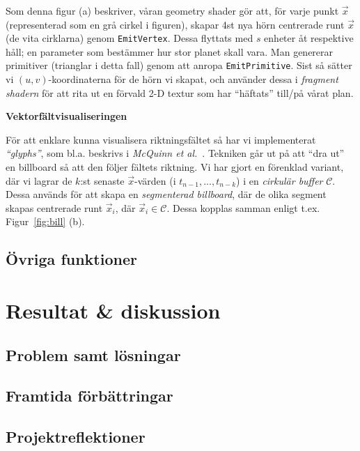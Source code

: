 \documentclass[a4paper]{article}
\begin{document}
\begin{multicols}{2}
Som denna figur (a) beskriver, våran geometry shader gör att, för varje punkt \(\vec{x}\) (representerad som en grå cirkel i figuren), skapar 4st nya hörn centrerade runt \(\vec{x}\) (de vita cirklarna) genom \texttt{EmitVertex}. Dessa flyttats med \(s\) enheter åt respektive håll; en parameter som bestämmer hur stor planet skall vara. Man genererar primitiver (trianglar i detta fall) genom att anropa \texttt{EmitPrimitive}. Sist så sätter vi \((u, v)\)-koordinaterna för de hörn vi skapat, och använder dessa i \emph{fragment shadern} för att rita ut en förvald 2-D textur som har ``häftats'' till/på vårat plan.

\textbf{Vektorfältvisualiseringen}

För att enklare kunna visualisera riktningsfältet så har vi implementerat \emph{``glyphs''}, som bl.a. beskrivs i \emph{McQuinn et al.}~\cite{mcquinn2013glyphsea}. Tekniken går ut på att ``dra ut'' en billboard så att den följer fältets riktning. Vi har gjort en förenklad variant, där vi lagrar de \(k\):st senaste \(\vec{x}\)-värden (i \(t_{n-1}, ..., t_{n-k}\)) i en \emph{cirkulär buffer} \(\mathcal{C}\). Dessa används för att skapa en \emph{segmenterad billboard}, där de olika segment skapas centrerade runt \(\vec{x}_i\), där \(\vec{x}_i \in \mathcal{C}\). Dessa kopplas samman enligt t.ex. Figur~\ref{fig:bill} (b).

\subsection{Övriga funktioner}

\section{Resultat \& diskussion} \label{sec:results}

        \subsection{Problem samt lösningar}

        \subsection{Framtida förbättringar}

        \subsection{Projektreflektioner}

    \nocite{*} %
    
    
\end{multicols}
\end{document}
